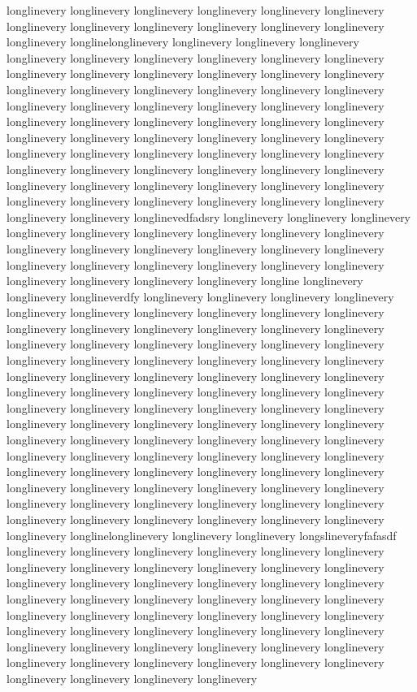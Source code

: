 {longlinevery longlinevery longlinevery longlinevery longlinevery longlinevery longlinevery longlinevery longlinevery longlinevery longlinevery longlinevery longlinevery longlinelonglinevery longlinevery longlinevery longlinevery longlinevery longlinevery longlinevery longlinevery longlinevery longlinevery longlinevery longlinevery longlinevery longlinevery longlinevery longlinevery longlinevery longlinevery longlinevery longlinevery longlinevery longlinevery longlinevery longlinevery longlinevery longlinevery longlinevery longlinevery longlinevery longlinevery longlinevery longlinevery longlinevery longlinevery longlinevery longlinevery longlinevery longlinevery longlinevery longlinevery longlinevery longlinevery longlinevery longlinevery longlinevery longlinevery longlinevery longlinevery longlinevery longlinevery longlinevery longlinevery longlinevery longlinevery longlinevery longlinevery longlinevery longlinevery longlinevery longlinevery longlinevery longlinevery longlinevery longlinevery longlinevery longlinevery longlinevedfadsry longlinevery longlinevery longlinevery longlinevery longlinevery longlinevery longlinevery longlinevery longlinevery longlinevery longlinevery longlinevery longlinevery longlinevery longlinevery longlinevery longlinevery longlinevery longlinevery longlinevery longlinevery longlinevery longlinevery longlinevery longlinevery longline longlinevery longlinevery longlineverdfy longlinevery longlinevery longlinevery longlinevery longlinevery longlinevery longlinevery longlinevery longlinevery longlinevery longlinevery longlinevery longlinevery longlinevery longlinevery longlinevery longlinevery longlinevery longlinevery longlinevery longlinevery longlinevery longlinevery longlinevery longlinevery longlinevery longlinevery longlinevery longlinevery longlinevery longlinevery longlinevery longlinevery longlinevery longlinevery longlinevery longlinevery longlinevery longlinevery longlinevery longlinevery longlinevery longlinevery longlinevery longlinevery longlinevery longlinevery longlinevery longlinevery longlinevery longlinevery longlinevery longlinevery longlinevery longlinevery longlinevery longlinevery longlinevery longlinevery longlinevery longlinevery longlinevery longlinevery longlinevery longlinevery longlinevery longlinevery longlinevery longlinevery longlinevery longlinevery longlinevery longlinevery longlinevery longlinevery longlinevery longlinevery longlinevery longlinevery longlinevery longlinevery longlinevery longlinevery longlinevery longlinevery longlinevery longlinevery longlinevery longlinevery longlinelonglinevery longlinevery longlinevery longslineveryfafasdf longlinevery longlinevery longlinevery longlinevery longlinevery longlinevery longlinevery longlinevery longlinevery longlinevery longlinevery longlinevery longlinevery longlinevery longlinevery longlinevery longlinevery longlinevery longlinevery longlinevery longlinevery longlinevery longlinevery longlinevery longlinevery longlinevery longlinevery longlinevery longlinevery longlinevery longlinevery longlinevery longlinevery longlinevery longlinevery longlinevery longlinevery longlinevery longlinevery longlinevery longlinevery longlinevery longlinevery longlinevery longlinevery longlinevery longlinevery longlinevery longlinevery longlinevery longlinevery longlinevery }
